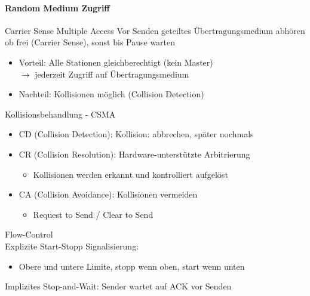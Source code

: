 \paragraph{Random Medium Zugriff}

\begin{definition}{Carrier Sense Multiple Access} Vor Senden geteiltes Übertragungsmedium abhören ob frei (Carrier Sense), sonst bis Pause warten
    \begin{itemize}
        \item Vorteil: Alle Stationen gleichberechtigt (kein Master) \\ $\rightarrow$ jederzeit Zugriff auf Übertragungsmedium
        \item Nachteil: Kollisionen möglich (Collision Detection)
    \end{itemize}
\end{definition}

\begin{concept}{Kollisionsbehandlung - CSMA}
    \begin{itemize}
        \item CD (Collision Detection): Kollision: abbrechen, später nochmals
        \item CR (Collision Resolution): Hardware-unterstützte Arbitrierung
        \begin{itemize}
            \item Kollisionen werden erkannt und kontrolliert aufgelöst
        \end{itemize}
        \item CA (Collision Avoidance): Kollisionen vermeiden
        \begin{itemize}
            \item Request to Send / Clear to Send
        \end{itemize}
    \end{itemize}
\end{concept}

\begin{concept}{Flow-Control}\\
    Explizite Start-Stopp Signalisierung:
    \begin{itemize}
        \item Obere und untere Limite, stopp wenn oben, start wenn unten
    \end{itemize}
    Implizites Stop-and-Wait: Sender wartet auf ACK vor Senden
\end{concept}